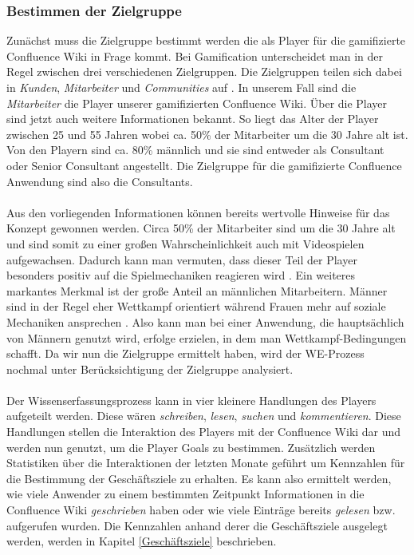 \documentclass[a4paper,12pt]{scrartcl}
\begin{document}
\subsubsection{Bestimmen der Zielgruppe}
Zunächst muss die Zielgruppe bestimmt werden die als Player für die gamifizierte Confluence Wiki in Frage kommt. Bei Gamification unterscheidet man in der Regel zwischen drei verschiedenen Zielgruppen. Die Zielgruppen teilen sich dabei in \textit{Kunden}, \textit{Mitarbeiter} und \textit{Communities} auf \cite{gamificationDefinition}. In unserem Fall sind die \textit{Mitarbeiter} die Player unserer gamifizierten Confluence Wiki. Über die Player sind jetzt auch weitere Informationen bekannt. So liegt das Alter der Player zwischen 25 und 55 Jahren wobei ca. 50\% der Mitarbeiter um die 30 Jahre alt ist. Von den Playern sind ca. 80\% männlich und sie sind entweder als Consultant oder Senior Consultant angestellt. Die Zielgruppe für die gamifizierte Confluence Anwendung sind also die Consultants. 
\\\\
Aus den vorliegenden Informationen können bereits wertvolle Hinweise für das Konzept gewonnen werden. Circa 50\% der Mitarbeiter sind um die 30 Jahre alt und sind somit zu einer großen Wahrscheinlichkeit auch mit Videospielen aufgewachsen. Dadurch kann man vermuten, dass dieser Teil der Player besonders positiv auf die Spielmechaniken reagieren wird \cite{Persona2018}. Ein weiteres markantes Merkmal ist der große Anteil an männlichen Mitarbeitern. Männer sind in der Regel eher Wettkampf orientiert während Frauen mehr auf soziale Mechaniken ansprechen \cite{Persona2018}. Also kann man bei einer Anwendung, die hauptsächlich von Männern genutzt wird, erfolge erzielen, in dem man Wettkampf-Bedingungen schafft. Da wir nun die Zielgruppe ermittelt haben, wird der WE-Prozess nochmal unter Berücksichtigung der Zielgruppe analysiert. 
\\\\
Der Wissenserfassungsprozess kann in vier kleinere Handlungen des Players aufgeteilt werden. Diese wären \textit{schreiben}, \textit{lesen}, \textit{suchen} und \textit{kommentieren}. Diese Handlungen stellen die Interaktion des Players mit der Confluence Wiki dar und werden nun genutzt, um die Player Goals zu bestimmen. Zusätzlich werden Statistiken über die Interaktionen der letzten Monate geführt um Kennzahlen für die Bestimmung der Geschäftsziele zu erhalten. Es kann also ermittelt werden, wie viele Anwender zu einem bestimmten Zeitpunkt Informationen in die Confluence Wiki \textit{geschrieben} haben oder wie viele Einträge bereits \textit{gelesen} bzw. aufgerufen wurden. Die Kennzahlen anhand derer die Geschäftsziele ausgelegt werden, werden in Kapitel \ref{Geschäftsziele} beschrieben.
\end{document}
